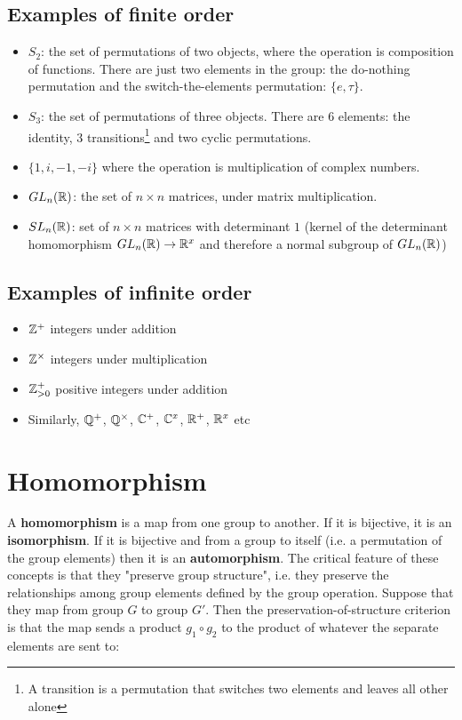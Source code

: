 \subsection{Examples of finite order}

\begin{itemize}
\item $S_2$: the set of permutations of two objects, where the operation is
  composition of functions.  There are just two elements in the group: the
  do-nothing permutation and the switch-the-elements permutation: $\{e,
  \tau\}$.

\item $S_3$: the set of permutations of three objects. There are 6 elements: the
  identity, 3 transitions\footnote{A transition is a permutation that switches two
  elements and leaves all other alone} and two cyclic permutations.

\item $\{1, i, -1, -i\}$ where the operation is multiplication of complex numbers.

\item $GL_n(\mathbb{R})$: the set of $n \times n$ matrices, under matrix multiplication.

\item $SL_n(\mathbb{R})$: set of $n \times n$ matrices with determinant $1$ (kernel of the
  determinant homomorphism $GL_n(\mathbb{R}) \rightarrow \mathbb{R}^x$ and therefore a normal
  subgroup of $GL_n(\mathbb{R})$)
\end{itemize}

\subsection{Examples of infinite order}

\begin{itemize}
\item $\mathbb{Z}^+$ integers under addition

\item $\mathbb{Z}^\times$ integers under multiplication

\item $\mathbb{Z}_{>0}^+$ positive integers under addition

\item Similarly, $\mathbb{Q}^+$, $\mathbb{Q}^\times$, $\mathbb{C}^+$, $\mathbb{C}^x$, $\mathbb{R}^+$, $\mathbb{R}^x$ etc

\end{itemize}

\section{Homomorphism}
A \textbf{homomorphism} is a map from one group to another. If it is bijective,
it is an \textbf{isomorphism}. If it is bijective and from a group to itself
(i.e. a permutation of the group elements) then it is an
\textbf{automorphism}. The critical feature of these concepts is that they
"preserve group structure", i.e. they preserve the relationships among group
elements defined by the group operation. Suppose that they map from group $G$
to group $G'$. Then the preservation-of-structure criterion is that the map
sends a product $g_1 \circ g_2$ to the product of whatever the separate
elements are sent to:


